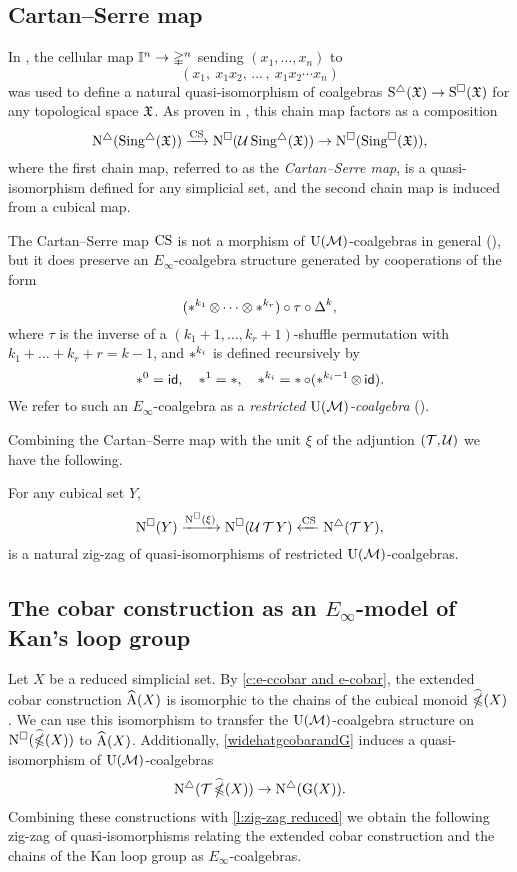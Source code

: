 \subsection{Cartan--Serre map}

In \cite[p.442]{serre1951homologie}, the cellular map $\mathbb{I}^n \to \mathbb{\Delta}^n$ sending
$(x_1, \dots, x_n)$ to
\[
(x_1,\ x_1 x_2, \, \dots \, , \ x_1 x_2 \dotsm x_n)
\]
was used to define a natural quasi-isomorphism of coalgebras $\operatorname{S^{\triangle}}(\mathfrak{X}) \to \operatorname{S^{\square}}(\mathfrak{X})$ for any topological space $\mathfrak{X}$.
As proven in \cite[\S5.7]{medina2022cube_einfty}, this chain map factors as a composition
\[
\operatorname{N^{\triangle}}(\operatorname{Sing^{\triangle}}(\mathfrak{X})) \xrightarrow{\operatorname{CS}}
\operatorname{N^{\square}}(\mathcal{U} \operatorname{Sing^{\triangle}}(\mathfrak{X})) \to
\operatorname{N^{\square}}(\operatorname{Sing^{\square}}(\mathfrak{X})),
\]
where the first chain map, referred to as the \textit{Cartan--Serre map}, is a quasi-isomorphism defined for any simplicial set, and the second chain map is induced from a cubical map.

The Cartan--Serre map $\operatorname{CS}$ is not a morphism of ${\operatorname{U}(\mathcal{M})}$-coalgebras in general (\cite[$\S$5.4]{medina2022cube_einfty}), but it does preserve an $E_\infty$-coalgebra structure generated by cooperations of the form
\[
(\operatorname{\ast}^{k_1} \otimes\dotsb\otimes \operatorname{\ast}^{k_r}) \circ \tau \circ \operatorname{\Delta}^{k},
\]
where $\tau$ is the inverse of a $(k_1+1,\dots,k_r+1)$-shuffle permutation with $k_1+\dots+k_r+r = k-1$, and $\operatorname{\ast}^{k_i}$ is defined recursively by
\[
\operatorname{\ast}^0 = \mathsf{id}, \quad \operatorname{\ast}^1 = \operatorname{\ast}, \quad \operatorname{\ast}^{k_i} = \operatorname{\ast} \circ (\operatorname{\ast}^{k_i-1} \otimes\, \mathsf{id}).
\]
We refer to such an $E_\infty$-coalgebra as a \textit{restricted ${\operatorname{U}(\mathcal{M})}$-coalgebra} (\cite[\S5.6]{medina2022cube_einfty}).

Combining the Cartan--Serre map with the unit $\xi$ of the adjuntion $(\operatorname{\mathcal{T}}, \mathcal{U})$ we have the following.

\begin{lemma}\label{l:zig-zag reduced}
	For any cubical set $Y$,
	\[
	\operatorname{N^{\square}}(Y) \xrightarrow{\operatorname{N^{\square}}(\xi)}
	\operatorname{N^{\square}}(\operatorname{\mathcal{U}}{\operatorname{\mathcal{T}} Y}) \xleftarrow{\operatorname{CS}}
	\operatorname{N^{\triangle}}(\operatorname{\mathcal{T}} Y),
	\]
	is a natural zig-zag of quasi-isomorphisms of restricted ${\operatorname{U}(\mathcal{M})}$-coalgebras.
\end{lemma}

\subsection{The cobar construction as an $E_\infty$-model of Kan's loop group}

Let $X$ be a reduced simplicial set.
By \cref{c:e-ccobar and e-cobar}, the extended cobar construction $\operatorname{\widehat{A}}(X)$ is isomorphic to the chains of the cubical monoid $\operatorname{\widehat{\mathbb{\Omega}}}(X)$.
We can use this isomorphism to transfer the ${\operatorname{U}(\mathcal{M})}$-coalgebra structure on $\operatorname{N^{\square}}(\operatorname{\widehat{\mathbb{\Omega}}}(X))$ to $\operatorname{\widehat{A}}(X)$.
Additionally, \cref{widehatgcobarandG} induces a quasi-isomorphism of ${\operatorname{U}(\mathcal{M})}$-coalgebras
\[
\operatorname{N^{\triangle}}(\operatorname{\mathcal{T}}\operatorname{\widehat{\mathbb{\Omega}}}(X)) \to \operatorname{N^{\triangle}}(\operatorname{G}(X)).
\]
Combining these constructions with \cref{l:zig-zag reduced} we obtain the following zig-zag of quasi-isomorphisms relating the extended cobar construction and the chains of the Kan loop group as $E_\infty$-coalgebras.

